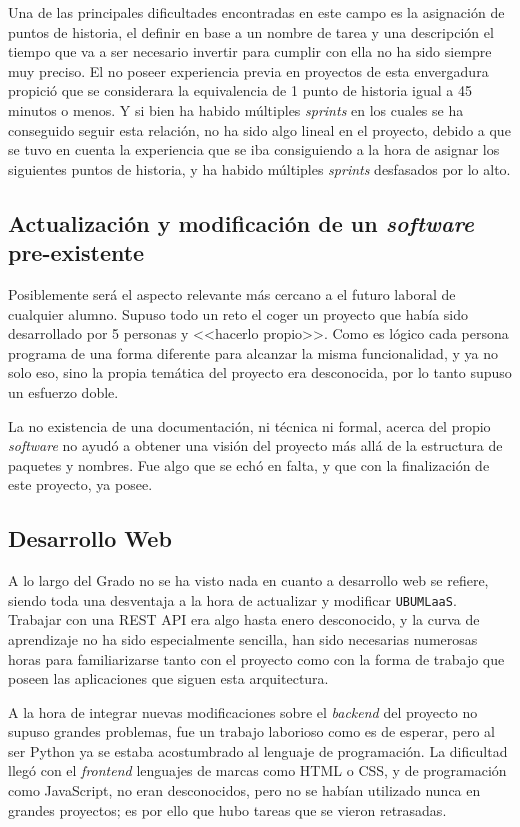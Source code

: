 Una de las principales dificultades encontradas en este campo es la asignación de puntos de historia, el definir en base a un nombre de tarea y una descripción el tiempo que va a ser necesario invertir para cumplir con ella no ha sido siempre muy preciso. El no poseer experiencia previa en proyectos de esta envergadura propició que se considerara la equivalencia de 1 punto de historia igual a 45 minutos o menos. Y si bien ha habido múltiples \textit{sprints} en los cuales se ha conseguido seguir esta relación, no ha sido algo lineal en el proyecto, debido a que se tuvo en cuenta la experiencia que se iba consiguiendo a la hora de asignar los siguientes puntos de historia, y ha habido múltiples \textit{sprints} desfasados por lo alto.

\subsection{Actualización y modificación de un \textit{software} pre-existente}
Posiblemente será el aspecto relevante más cercano a el futuro laboral de cualquier alumno. Supuso todo un reto el coger un proyecto que había sido desarrollado por 5 personas y <<hacerlo propio>>. Como es lógico cada persona programa de una forma diferente para alcanzar la misma funcionalidad, y ya no solo eso, sino la propia temática del proyecto era desconocida, por lo tanto supuso un esfuerzo doble.

La no existencia de una documentación, ni técnica ni formal, acerca del propio \textit{software} no ayudó a obtener una visión del proyecto más allá de la estructura de paquetes y nombres. Fue algo que se echó en falta, y que con la finalización de este proyecto, ya posee.

\subsection{Desarrollo Web}
A lo largo del Grado no se ha visto nada en cuanto a desarrollo web se refiere, siendo toda una desventaja a la hora de actualizar y modificar \texttt{UBUMLaaS}. Trabajar con una REST API era algo hasta enero desconocido, y la curva de aprendizaje no ha sido especialmente sencilla, han sido necesarias numerosas horas para familiarizarse tanto con el proyecto como con la forma de trabajo que poseen las aplicaciones que siguen esta arquitectura.

A la hora de integrar nuevas modificaciones sobre el \textit{backend} del proyecto no supuso grandes problemas, fue un trabajo laborioso como es de esperar, pero al ser Python ya se estaba acostumbrado al lenguaje de programación. La dificultad llegó con el \textit{frontend} lenguajes de marcas como HTML o CSS, y de programación como JavaScript, no eran desconocidos, pero no se habían utilizado nunca en grandes proyectos; es por ello que hubo tareas que se vieron retrasadas. 

